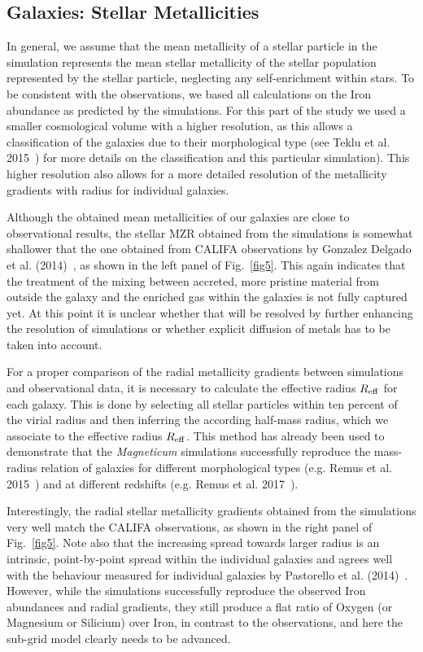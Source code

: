 \documentclass[galaxies,letter,accept,moreauthors,pdftex,10pt,a4paper,usenatbib]{mdpi}
\begin{document}
\subsection{Galaxies: Stellar Metallicities}
In general, we assume that the mean metallicity of a stellar particle
in the simulation represents the mean stellar metallicity of the
stellar population represented by the stellar particle, neglecting any
self-enrichment within stars. To be consistent with the observations,
we based all calculations on the Iron abundance as predicted by the
simulations. For this part of the study we used a smaller cosmological
volume with a higher resolution, as this allows a classification of
the galaxies due to their morphological type (see Teklu et al.
2015~\cite{Teklu2015}) for more details on the classification and this
particular simulation). This higher resolution also allows for a more
detailed resolution of the metallicity gradients with radius for
individual galaxies.

Although the obtained mean metallicities of our galaxies are close to
observational results, the stellar MZR obtained from the simulations
is somewhat shallower that the one obtained from CALIFA observations
by Gonzalez Delgado et al. (2014)~\cite{gonzalez14}, as shown in the
left panel of Fig.~\ref{fig5}. This again indicates that the treatment
of the mixing between accreted, more pristine material from outside
the galaxy and the enriched gas within the galaxies is not fully
captured yet.  At this point it is unclear whether that will be
resolved by further enhancing the resolution of simulations or whether
explicit diffusion of metals has to be taken into account.

For a proper comparison of the radial metallicity gradients between
simulations and observational data, it is necessary to calculate the
effective radius $R_{\rm eff}$ for each galaxy. This is done by
selecting all stellar particles within ten percent of the virial
radius and then inferring the according half-mass radius, which we
associate to the effective radius $R_{\rm eff}$. This method has
already been used to demonstrate that the {\it Magneticum} simulations
successfully reproduce the mass-radius relation of galaxies for
different morphological types (e.g. Remus et al.
2015~\cite{2015IAUS..309..145R}) and at different redshifts
(e.g. Remus et al. 2017~\cite{Remus2017}).

Interestingly, the radial stellar metallicity gradients obtained from
the simulations very well match the CALIFA observations, as shown in
the right panel of Fig.~\ref{fig5}. Note also that the increasing
spread towards larger radius is an intrinsic, point-by-point spread
within the individual galaxies and agrees well with the behaviour
measured for individual galaxies by Pastorello et
al. (2014)~\cite{2014MNRAS.442.1003P}. However, while the simulations
successfully reproduce the observed Iron abundances and radial
gradients, they still produce a flat ratio of Oxygen (or Magnesium or
Silicium) over Iron, in contrast to the observations, and here the
sub-grid model clearly needs to be advanced. 
\end{document}
